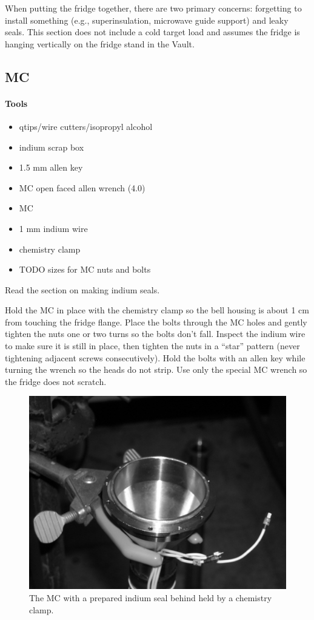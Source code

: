 When putting the fridge together, there are two primary concerns: forgetting to install something (e.g., superinsulation, microwave guide support) and leaky seals.  This section does not include a cold target load and assumes the fridge is hanging vertically on the fridge stand in the Vault.

\subsection{MC}
\paragraph{Tools}
\begin{itemize}
 \item qtips/wire cutters/isopropyl alcohol
\item indium scrap box
\item 1.5 mm allen key
\item MC open faced allen wrench (4.0)
\item MC
\item 1 mm indium wire
\item chemistry clamp
\item TODO sizes for MC nuts and bolts
\end{itemize}

Read the section on making indium seals.

Hold the MC in place with the chemistry clamp so the bell housing is about 1 cm from touching the fridge flange.  Place the bolts through the MC holes and gently tighten the nuts one or two turns so the bolts don't fall.  Inspect the indium wire to make sure it is still in place, then tighten the nuts in a ``star'' pattern (never tightening adjacent screws consecutively).  Hold the bolts with an allen key while turning the wrench so the heads do not strip.  Use only the special MC wrench so the fridge does not scratch.

\begin{figure}
 \centering
 \includegraphics[scale=.75]{img/mc-stand.jpg}
 \caption{The MC with a prepared indium seal behind held by a chemistry clamp.}
 \label{fig:mc-stand}
\end{figure}


